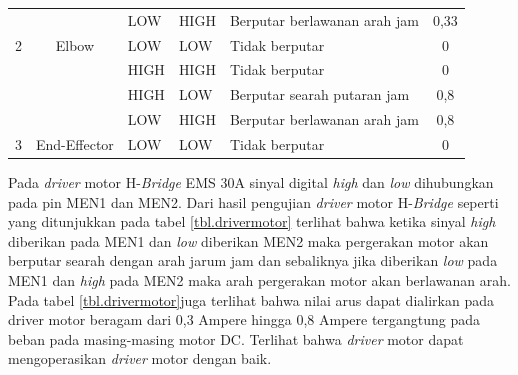 \begin{table}[H]
\begin{tabular}{|c|c|l|l|l|c|}
			&                                                 & LOW                          & HIGH                         & Berputar berlawanan arah jam                                           & 0,33                                                \\ \cline{3-6} 
			\multirow{-4}{*}{2}                          & \multirow{-4}{*}{Elbow}                         & LOW                          & LOW                          & Tidak berputar                                                         & 0                                                   \\ \hline
			&                                                 & HIGH                         & HIGH                         & Tidak berputar                                                         & 0                                                   \\ \cline{3-6} 
			&                                                 & HIGH                         & LOW                          & Berputar searah putaran jam                                            & 0,8                                                 \\ \cline{3-6} 
			&                                                 & LOW                          & HIGH                         & Berputar berlawanan arah jam                                           & 0,8                                                 \\ \cline{3-6} 
			\multirow{-4}{*}{3}                          & \multirow{-4}{*}{End-Effector}                  & LOW                          & LOW                          & Tidak berputar                                                         & 0                                                   \\ \hline
		\end{tabular}
\end{table} 

 Pada \textit{driver} motor H-\textit{Bridge} EMS 30A sinyal digital \textit{high} dan \textit{low} dihubungkan pada pin MEN1 dan MEN2. Dari hasil pengujian \textit{driver} motor H-\textit{Bridge} seperti yang ditunjukkan pada tabel \ref{tbl.drivermotor} terlihat bahwa ketika sinyal \textit{high} diberikan pada MEN1 dan \textit{low} diberikan MEN2 maka pergerakan motor akan berputar searah dengan arah jarum jam dan sebaliknya jika diberikan \textit{low} pada MEN1 dan \textit{high} pada MEN2 maka arah pergerakan motor akan berlawanan arah. Pada tabel \ref{tbl.drivermotor}juga terlihat bahwa nilai arus dapat dialirkan pada driver motor beragam dari 0,3 Ampere hingga 0,8 Ampere tergangtung pada beban pada masing-masing motor DC. Terlihat bahwa \textit{driver} motor dapat mengoperasikan \textit{driver} motor dengan baik.

